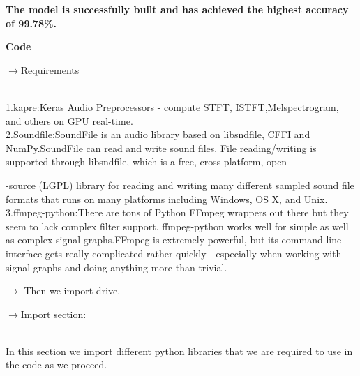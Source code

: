 \documentclass[a4paper,12pt]{article}
\begin{document}
\textbf{The model is successfully built and has achieved the highest accuracy of 99.78\%.}\\

\pagebreak

\textbf{Code}

\begin{large}
$\rightarrow$Requirements
\end{large}\\

1.kapre:Keras Audio Preprocessors - compute STFT, ISTFT,Melspectrogram,
 \hspace*{0.5cm} and others on GPU real-time.\\
 

2.Soundfile:SoundFile is an audio library based on libsndfile, CFFI and
 \hspace*{0.5cm}     NumPy.SoundFile can read and write sound files. File reading/writing 
 \hspace*{0.5cm} is supported through libsndfile, which is a free, cross-platform, open
 
         \hspace*{0.5cm}-source (LGPL) library for reading and writing many different sampled
          \hspace*{0.5cm} sound file formats that runs on many platforms including Windows, OS
          \hspace*{0.5cm} X, and Unix.\\

3.ffmpeg-python:There are tons of Python FFmpeg wrappers out there
\hspace*{0.5cm} but they seem to lack complex filter support. ffmpeg-python works well
\hspace*{0.5cm} for simple as well as complex signal graphs.FFmpeg is extremely powerful,
\hspace*{0.5cm} but its command-line interface gets really complicated rather quickly -
\hspace*{0.5cm} especially when working with signal graphs and doing anything more than \hspace*{0.5cm} trivial.

$\rightarrow$ Then we import drive.\\

\begin{large}
$\rightarrow$Import section:
\end{large}\\

In this section we import different python libraries that we are required
\hspace*{0.5cm} to use in the code as we proceed.\\
\end{document}
